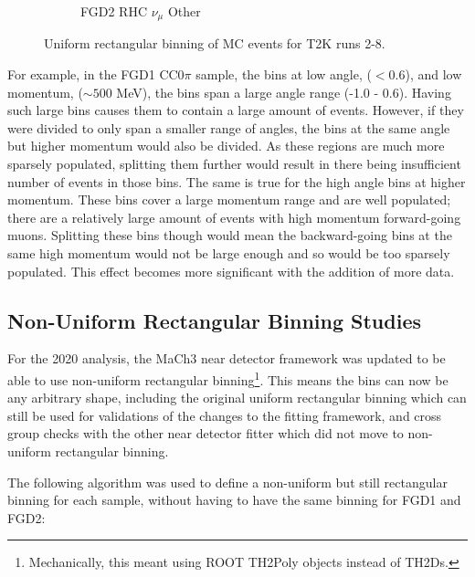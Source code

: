 \begin{figure}
\begin{subfigure}{.32\textwidth}
  \caption{FGD2 RHC $\nu_{\mu}$ Other}
  \label{fig:th2dFGD2_NuMuBkg_CCOther_in_AntiNu_Mode}
\end{subfigure}
\caption{Uniform rectangular binning of MC events for T2K runs 2-8.}
\label{fig:th2dbin}
\end{figure}

For example, in the FGD1 CC0$\pi$ sample, the bins at low angle, ($<0.6$), and low momentum, ($\sim500$ MeV), the bins span a large angle range (-1.0 - 0.6). Having such large bins causes them to contain a large amount of events. However, if they were divided to only span a smaller range of angles, the bins at the same angle but higher momentum would also be divided. As these regions are much more sparsely populated, splitting them further would result in there being insufficient number of events in those bins. The same is true for the high angle bins at higher momentum. These bins cover a large momentum range and are well populated; there are a relatively large amount of events with high momentum forward-going muons. Splitting these bins though would mean the backward-going bins at the same high momentum would not be large enough and so would be too sparsely populated. This effect becomes more significant with the addition of more data.

\subsection{Non-Uniform Rectangular Binning Studies}\label{sec:nonrecbinning}
\enlargethispage{\baselineskip}
For the 2020 analysis, the MaCh3 near detector framework was updated to be able to use non-uniform rectangular binning\footnote{Mechanically, this meant using ROOT\cite{root} TH2Poly objects instead of TH2Ds.}. This means the bins can now be any arbitrary shape, including the original uniform rectangular binning which can still be used for validations of the changes to the fitting framework, and cross group checks with the other near detector fitter which did not move to non-uniform rectangular binning.

The following algorithm was used to define a non-uniform but still rectangular binning for each sample, without having to have the same binning for FGD1 and FGD2:

